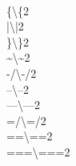 {    {\\\{}{{\textcolor{vertexDarkRed}{\textbackslash\{}}}{2}
    {\\|}{{\textcolor{vertexDarkRed}{\textbackslash|}}}{2}
    {\\\}}{{\textcolor{vertexDarkRed}{\textbackslash\}}}}{2}
    {\\\~}{{\textcolor{vertexDarkRed}{\textbackslash\textasciitilde}}}{2}
    {\\-/}{{\textcolor{vertexDarkRed}{\textbackslash-/}}}{2}
    {\\--}{{\textcolor{vertexDarkRed}{\textbackslash--}}}{2}
    {\\---}{{\textcolor{vertexDarkRed}{\textbackslash---}}}{2}
    {\\=/}{{\textcolor{vertexDarkRed}{\textbackslash=/}}}{2}
    {\\==}{{\textcolor{vertexDarkRed}{\textbackslash==}}}{2}
    {\\===}{{\textcolor{vertexDarkRed}{\textbackslash===}}}{2}
}
